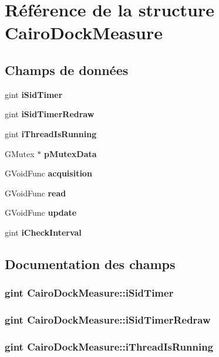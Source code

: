 \section{Référence de la structure CairoDockMeasure}
\label{structCairoDockMeasure}
\subsection*{Champs de données}
\begin{CompactItemize}
\item 
gint {\bf iSidTimer}
\item 
gint {\bf iSidTimerRedraw}
\item 
gint {\bf iThreadIsRunning}
\item 
GMutex $\ast$ {\bf pMutexData}
\item 
GVoidFunc {\bf acquisition}
\item 
GVoidFunc {\bf read}
\item 
GVoidFunc {\bf update}
\item 
gint {\bf iCheckInterval}
\end{CompactItemize}


\subsection{Documentation des champs}
\subsubsection{\setlength{\rightskip}{0pt plus 5cm}gint {\bf CairoDockMeasure::iSidTimer}}\label{structCairoDockMeasure_08d82d09bb8e1c1ad4675f352711bf6d}


\subsubsection{\setlength{\rightskip}{0pt plus 5cm}gint {\bf CairoDockMeasure::iSidTimerRedraw}}\label{structCairoDockMeasure_685311d3dcec16ff5967508ad93827a5}


\subsubsection{\setlength{\rightskip}{0pt plus 5cm}gint {\bf CairoDockMeasure::iThreadIsRunning}}\label{structCairoDockMeasure_4edd5a2ef9cf4c9e5190e7b075e8208c}


